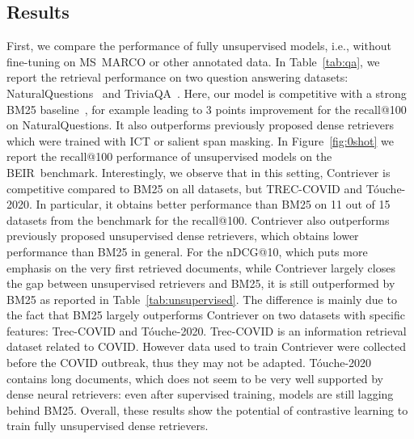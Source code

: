 \documentclass[10pt]{article} %
\def \ours          {Contriever}
\newcommand{\beir}{BEIR}
\begin{document}
\subsection{Results}
First, we compare the performance of fully unsupervised models, i.e., without fine-tuning on MS~MARCO or other annotated data.
In Table~\ref{tab:qa}, we report the retrieval performance on two question answering datasets: NaturalQuestions~\citep{kwiatkowski2019natural} and TriviaQA~\citep{JoshiTriviaQA2017}.
Here, our model is competitive with a strong BM25 baseline~\citep{ma2021replication}, for example leading to 3 points improvement for the recall@100 on NaturalQuestions.
It also outperforms previously proposed dense retrievers which were trained with ICT or salient span masking.
In Figure~\ref{fig:0shot} we report the recall@100 performance of unsupervised models on the \beir~benchmark.
Interestingly, we observe that in this setting, \ours{} is competitive compared to BM25 on all datasets, but TREC-COVID and T\'ouche-2020.
In particular, it obtains better performance than BM25 on 11 out of 15 datasets from the benchmark for the recall@100.
\ours{} also outperforms previously proposed unsupervised dense retrievers, which obtains lower performance than BM25 in general.
For the nDCG@10, which puts more emphasis on the very first retrieved documents, while \ours{} largely closes the gap between unsupervised retrievers and BM25, it is still outperformed by BM25 as reported in Table~\ref{tab:unsupervised}.
The difference is mainly due to the fact that BM25 largely outperforms \ours{} on two datasets with specific features: Trec-COVID and Tóuche-2020.
Trec-COVID is an information retrieval dataset related to COVID. 
However data used to train \ours{} were collected before the COVID outbreak, thus they may not be adapted.
Tóuche-2020 contains long documents, which does not seem to be very well supported by dense neural retrievers: even after supervised training, models are still lagging behind BM25.
Overall, these results show the potential of contrastive learning to train fully unsupervised dense retrievers.
\end{document}
